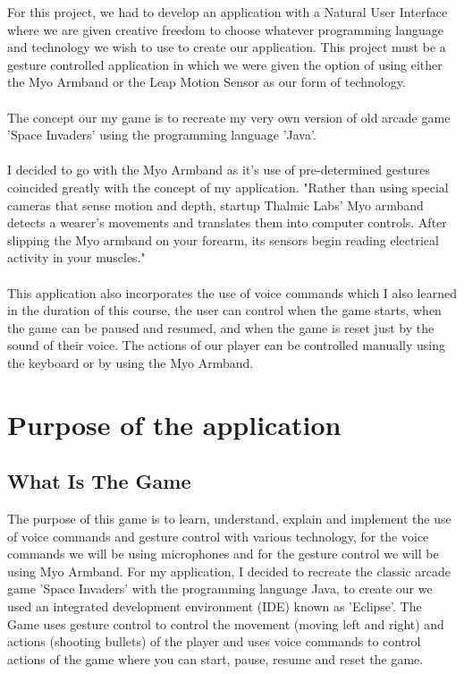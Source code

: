 \documentclass{article}
\begin{document}
For this project, we had to develop an application with a Natural User Interface where we are given creative freedom to choose whatever programming language and technology we wish to use to create our application. This project must be a gesture controlled application in which we were given the option of using either the Myo Armband or the Leap Motion Sensor as our form of technology.\\ \\
The concept our my game is to recreate my very own version of old arcade game 'Space Invaders' using the programming language 'Java'.\\ \\
I decided to go with the Myo Armband as it's use of pre-determined gestures coincided greatly with the concept of my application. "Rather than using special cameras that sense motion and depth, startup Thalmic Labs' Myo armband detects a wearer's movements and translates them into computer controls. After slipping the Myo armband on your forearm, its sensors begin reading electrical activity in your muscles."\\ \\
This application also incorporates the use of voice commands which I also learned in the duration of this course, the user can control when the game starts, when the game can be paused and resumed, and when the game is reset just by the sound of their voice. The actions of our player can be controlled manually using the keyboard or by using the Myo Armband.

\section{Purpose of the application}

\subsection{What Is The Game}

The purpose of this game is to learn, understand, explain and implement the use of voice commands and gesture control with various technology, for the voice commands we will be using microphones and for the gesture control we will be using Myo Armband. For my application, I decided to recreate the classic arcade game 'Space Invaders' with the programming language Java, to create our we used an integrated development environment (IDE) known as 'Eclipse'. The Game uses gesture control to control the movement (moving left and right) and actions (shooting bullets) of the player and uses voice commands to control actions of the game where you can start, pause, resume and reset the game.
\end{document}
